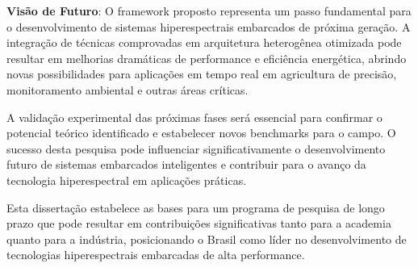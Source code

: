 \textbf{Visão de Futuro}:
O framework proposto representa um passo fundamental para o desenvolvimento de sistemas hiperespectrais embarcados de próxima geração. A integração de técnicas comprovadas em arquitetura heterogênea otimizada pode resultar em melhorias dramáticas de performance e eficiência energética, abrindo novas possibilidades para aplicações em tempo real em agricultura de precisão, monitoramento ambiental e outras áreas críticas.

A validação experimental das próximas fases será essencial para confirmar o potencial teórico identificado e estabelecer novos benchmarks para o campo. O sucesso desta pesquisa pode influenciar significativamente o desenvolvimento futuro de sistemas embarcados inteligentes e contribuir para o avanço da tecnologia hiperespectral em aplicações práticas.

Esta dissertação estabelece as bases para um programa de pesquisa de longo prazo que pode resultar em contribuições significativas tanto para a academia quanto para a indústria, posicionando o Brasil como líder no desenvolvimento de tecnologias hiperespectrais embarcadas de alta performance.